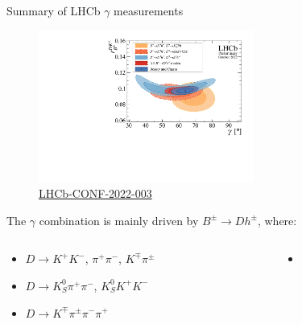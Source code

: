 \documentclass[xcolor={dvipsnames}]{beamer}
\begin{document}
\begin{frame}{Summary of LHCb \texorpdfstring{$\gamma$}{gamma} measurements}
  \begin{figure}
    \includegraphics[height=5cm]{Plots/gammacharm_lhcb_dhch_g_r_dk.pdf}
    \vspace{-0.7cm}
    \caption*{\tiny\href{https://lhcbproject.web.cern.ch/Publications/LHCbProjectPublic/LHCb-CONF-2022-003.html}{LHCb-CONF-2022-003}}
  \end{figure}
  \vspace{-0.8cm}
  \begin{center}
    The $\gamma$ combination is mainly driven by $B^\pm\to Dh^\pm$, where:
  \end{center}
  \vspace{-0.2cm}
  \begin{columns}
    \begin{column}{0.5\textwidth}
      \begin{itemize}
        \setlength\itemsep{0.5em}
        \item{$D\to K^+K^-$, $\pi^+\pi^-$, $K^\mp\pi^\pm$}
        \item{$D\to K_S^0\pi^+\pi^-$, $K_S^0K^+K^-$}
        \item{$D\to K^\mp\pi^\pm\pi^-\pi^+$}
      \end{itemize}
    \end{column}
    \begin{column}{0.5\textwidth}
      \begin{itemize}
        \item[]{}
      \end{itemize}
    \end{column}
  \end{columns}
\end{frame}
\end{document}
